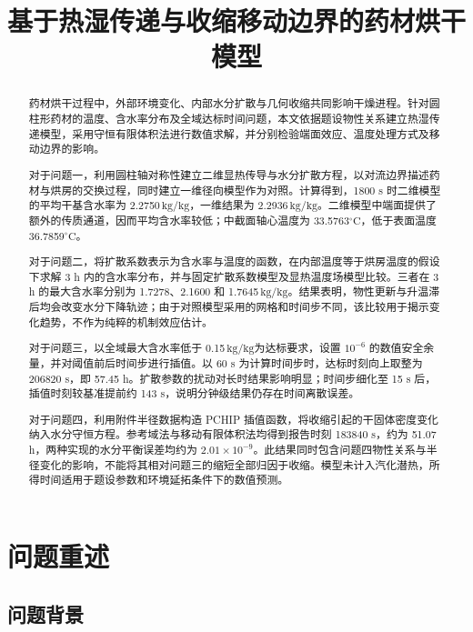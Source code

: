 \documentclass[withoutpreface,bwprint]{cumcmthesis}
\title{基于热湿传递与收缩移动边界的药材烘干模型}
\newcommand{\kgkg}{\ensuremath{\mathrm{kg/kg}}}
\begin{document}
\maketitle

\begin{abstract}
药材烘干过程中，外部环境变化、内部水分扩散与几何收缩共同影响干燥进程。针对圆柱形药材的温度、含水率分布及全域达标时间问题，本文依据题设物性关系建立热湿传递模型，采用守恒有限体积法进行数值求解，并分别检验端面效应、温度处理方式及移动边界的影响。

对于问题一，利用圆柱轴对称性建立二维显热传导与水分扩散方程，以对流边界描述药材与烘房的交换过程，同时建立一维径向模型作为对照。计算得到，1800 s 时二维模型的平均干基含水率为 2.2750\,\kgkg，一维结果为 2.2936\,\kgkg。二维模型中端面提供了额外的传质通道，因而平均含水率较低；中截面轴心温度为 33.5763\(^{\circ}\mathrm C\)，低于表面温度 36.7859\(^{\circ}\mathrm C\)。

对于问题二，将扩散系数表示为含水率与温度的函数，在内部温度等于烘房温度的假设下求解 3 h 内的含水率分布，并与固定扩散系数模型及显热温度场模型比较。三者在 3 h 的最大含水率分别为 1.7278、2.1600 和 1.7645\,\kgkg。结果表明，物性更新与升温滞后均会改变水分下降轨迹；由于对照模型采用的网格和时间步不同，该比较用于揭示变化趋势，不作为纯粹的机制效应估计。

对于问题三，以全域最大含水率低于 0.15\,\kgkg 为达标要求，设置 \(10^{-6}\) 的数值安全余量，并对阈值前后时间步进行插值。以 60 s 为计算时间步时，达标时刻向上取整为 206820 s，即 57.45 h。扩散参数的扰动对长时结果影响明显；时间步细化至 15 s 后，插值时刻较基准提前约 143 s，说明分钟级结果仍存在时间离散误差。

对于问题四，利用附件半径数据构造 PCHIP 插值函数，将收缩引起的干固体密度变化纳入水分守恒方程。参考域法与移动有限体积法均得到报告时刻 183840 s，约为 51.07 h，两种实现的水分平衡误差均约为 \(2.01\times10^{-9}\)。此结果同时包含问题四物性关系与半径变化的影响，不能将其相对问题三的缩短全部归因于收缩。模型未计入汽化潜热，所得时间适用于题设参数和环境延拓条件下的数值预测。

\end{abstract}

\section{问题重述}

\subsection{问题背景}
\end{document}
